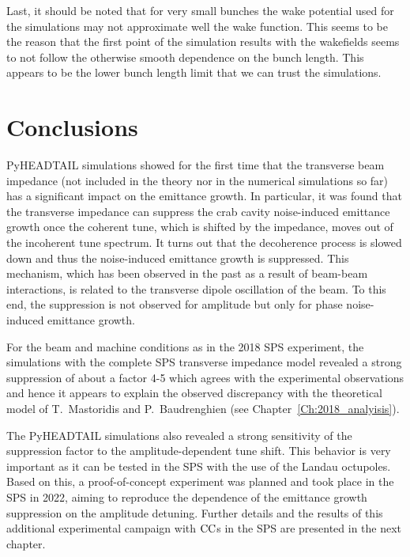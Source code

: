  Last, it should be noted that for very small bunches the wake potential used for the simulations may not approximate well the wake function. This seems to be the reason that the first point of the simulation results with the wakefields seems to not follow the otherwise smooth dependence on the bunch length. This appears to be the lower bunch length limit that we can trust the simulations.




\section{Conclusions}\label{sec:Ch7_conclusions}
PyHEADTAIL simulations showed for the first time that the transverse beam impedance (not included in the theory nor in the numerical simulations so far) has a significant impact on the emittance growth. In particular, it was found that the transverse impedance can suppress the crab cavity noise-induced emittance growth once the coherent tune, which is shifted by the impedance, moves out of the incoherent tune spectrum. It turns out that the decoherence process is slowed down and thus the noise-induced emittance growth is suppressed. This mechanism, which has been observed in the past as a result of beam-beam interactions, is related to the transverse dipole oscillation of the beam. To this end, the suppression is not observed for amplitude but only for phase noise-induced emittance growth.

For the beam and machine conditions as in the 2018 SPS experiment, the simulations with the complete SPS transverse impedance model revealed a strong suppression of about a factor 4-5 which agrees with the experimental observations and hence it appears to explain the observed discrepancy with the theoretical model of T.~Mastoridis and P.~Baudrenghien (see Chapter~\ref{Ch:2018_analyisis}). 

The PyHEADTAIL simulations also revealed a strong sensitivity of the suppression factor to the amplitude-dependent tune shift. This behavior is very important as it can be tested in the SPS with the use of the Landau octupoles. Based on this, a proof-of-concept experiment was planned and took place in the SPS in 2022, aiming to reproduce the dependence of the emittance growth suppression on the amplitude detuning. Further details and the results of this additional experimental campaign with ${\mathrm{CC}}$s in the SPS are presented in the next chapter.




